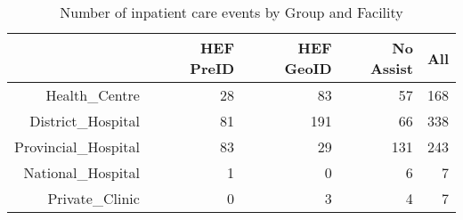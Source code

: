 \begin{table}[ht]
\centering
\begin{tabular}{rrrrr}
  \hline
 & HEF PreID & HEF GeoID & No Assist & All \\ 
  \hline
Health\_Centre &  28 &  83 &  57 & 168 \\ 
  District\_Hospital &  81 & 191 &  66 & 338 \\ 
  Provincial\_Hospital &  83 &  29 & 131 & 243 \\ 
  National\_Hospital &   1 &   0 &   6 &   7 \\ 
  Private\_Clinic &   0 &   3 &   4 &   7 \\ 
   \hline
\end{tabular}
\caption{Number of inpatient care events by Group and Facility} 
\end{table}
